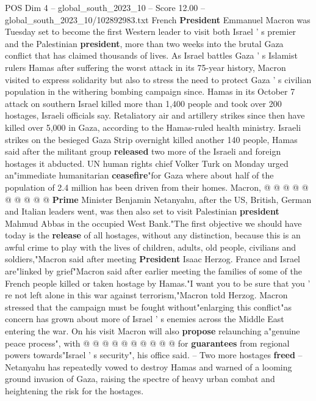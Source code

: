 \begin{textsample}{POS Dim 4 – global\_south\_2023\_10 – Score 12.00 – global\_south\_2023\_10/102892983.txt}  \label{ex:f4_pos_434}
French \textbf{President} Emmanuel Macron was Tuesday set to become the first Western leader to visit both Israel ' s premier and the Palestinian \textbf{president}, more than two weeks into the brutal Gaza conflict that has claimed thousands of lives.
As Israel battles Gaza ' s Islamist rulers Hamas after suffering the worst attack in its 75-year history, Macron visited to express solidarity but also to stress the need to protect Gaza ' s civilian population in the withering bombing campaign since.
Hamas in its October 7 attack on southern Israel killed more than 1,400 people and took over 200 hostages, Israeli officials say.
Retaliatory air and artillery strikes since then have killed over 5,000 in Gaza, according to the Hamas-ruled health ministry.
Israeli strikes on the besieged Gaza Strip overnight killed another 140 people, Hamas said after the militant group \textbf{released} two more of the Israeli and foreign hostages it abducted.
UN human rights chief Volker Turk on Monday urged an"immediate humanitarian \textbf{ceasefire}"for Gaza where about half of the population of 2.4 million has been driven from their homes.
Macron, @ @ @ @ @ @ @ @ @ @ \textbf{Prime} Minister Benjamin Netanyahu, after the US, British, German and Italian leaders went, was then also set to visit Palestinian \textbf{president} Mahmud Abbas in the occupied West Bank."The first objective we should have today is the \textbf{release} of all hostages, without any distinction, because this is an awful crime to play with the lives of children, adults, old people, civilians and soldiers,"Macron said after meeting \textbf{President} Isaac Herzog.
France and Israel are"linked by grief"Macron said after earlier meeting the families of some of the French people killed or taken hostage by Hamas."I want you to be sure that you ' re not left alone in this war against terrorism,"Macron told Herzog.
Macron stressed that the campaign must be fought without"enlarging this conflict"as concern has grown about more of Israel ' s enemies across the Middle East entering the war.
On his visit Macron will also \textbf{propose} relaunching a"genuine peace process", with @ @ @ @ @ @ @ @ @ @ for \textbf{guarantees} from regional powers towards"Israel ' s security", his office said. -- Two more hostages \textbf{freed} -- Netanyahu has repeatedly vowed to destroy Hamas and warned of a looming ground invasion of Gaza, raising the spectre of heavy urban combat and heightening the risk for the hostages.

\end{textsample}
